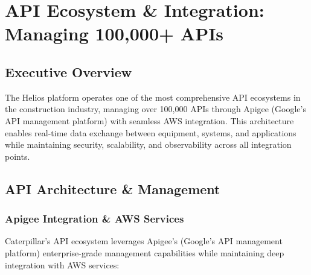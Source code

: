 \documentclass[12pt, a4paper]{article} %
\begin{document}

\section{API Ecosystem \& Integration: Managing 100,000+ APIs}

\subsection{Executive Overview}
The Helios platform operates one of the most comprehensive API ecosystems in the construction industry, managing over 100,000 APIs through Apigee (Google's API management platform) with seamless AWS integration. This architecture enables real-time data exchange between equipment, systems, and applications while maintaining security, scalability, and observability across all integration points.

\subsection{API Architecture \& Management}

\subsubsection{Apigee Integration \& AWS Services}
Caterpillar's API ecosystem leverages Apigee's (Google's API management platform) enterprise-grade management capabilities while maintaining deep integration with AWS services:
\end{document}
